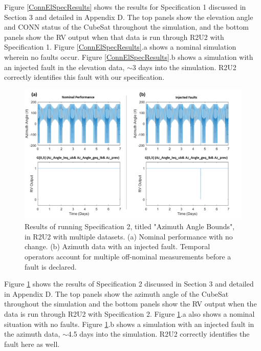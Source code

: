 \documentclass[conf]{new-aiaa}
\begin{document}
Figure \ref{ConnElSpecResults} shows the results for Specification 1 discussed in Section 3 and detailed in Appendix D. The top panels show the elevation angle and CONN status of the CubeSat throughout the simulation, and the bottom panels show the RV output when that data is run through R2U2 with Specification 1. Figure \ref{ConnElSpecResults}.a shows a nominal simulation wherein no faults occur. Figure \ref{ConnElSpecResults}.b shows a simulation with an injected fault in the elevation data, $\sim$3 days into the simulation. R2U2 correctly identifies this fault with our specification.

\begin{figure}[!ht]
\centering
\includegraphics[width=.8\textwidth]{Fig/Az_Spec2.png}
\caption{Results of running Specification 2, titled "Azimuth Angle Bounds", in R2U2 with multiple datasets. (a) Nominal performance with no change. (b) Azimuth data with an injected fault. Temporal operators account for multiple off-nominal measurements before a fault is declared.}
\label{AzAngle}
\end{figure}

Figure \ref{AzAngle} shows the results of Specification 2 discussed in Section 3 and detailed in Appendix D. The top panels show the azimuth angle of the CubeSat throughout the simulation and the bottom panels show the RV output when the data is run through R2U2 with Specification 2. Figure \ref{AzAngle}.a also shows a nominal situation with no faults. Figure \ref{AzAngle}.b shows a simulation with an injected fault in the azimuth data, $\sim$4.5 days into the simulation. R2U2 correctly identifies the fault here as well.
\end{document}
